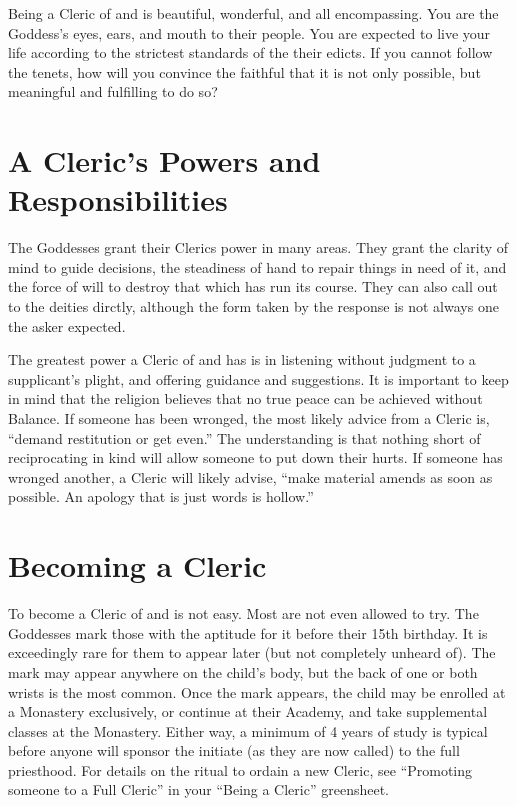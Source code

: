 \documentclass[blue]{GL2020}
\begin{document}
\name{\bLeauCleric{}}

Being a Cleric of \cEbbFull{\full} and \cFlowFull{\full} is beautiful, wonderful, and all encompassing. You are the Goddess's eyes, ears, and mouth to their people. You are expected to live your life according to the strictest standards of the their edicts. If you cannot follow the tenets, how will you convince the faithful that it is not only possible, but meaningful and fulfilling to do so?

\section{A Cleric's Powers and Responsibilities}
The Goddesses grant their Clerics power in many areas. They grant the clarity of mind to guide decisions, the steadiness of hand to repair things in need of it, and the force of will to destroy that which has run its course. They can also call out to the deities dirctly, although the form taken by the response is not always one the asker expected.

The greatest power a Cleric of \cEbb{} and \cFlow{} has is in listening without judgment to a supplicant's plight, and offering guidance and suggestions. It is important to keep in mind that the \pShip{} religion believes that no true peace can be achieved without Balance. If someone has been wronged, the most likely advice from a Cleric is, ``demand restitution or get even.'' The understanding is that nothing short of reciprocating in kind will allow someone to put down their hurts. If someone has wronged another, a Cleric will likely advise, ``make material amends as soon as possible. An apology that is just words is hollow.''

\section{Becoming a Cleric}
To become a Cleric of \cEbb{} and \cFlow{} is not easy. Most are not even allowed to try. The Goddesses mark those with the aptitude for it before their 15th birthday. It is exceedingly rare for them to appear later (but not completely unheard of). The mark may appear anywhere on the child's body, but the back of one or both wrists is the most common. Once the mark appears, the child may be enrolled at a Monastery exclusively, or continue at their Academy, and take supplemental classes at the Monastery. Either way, a minimum of 4 years of study is typical before anyone will sponsor the initiate (as they are now called) to the full priesthood. For details on the ritual to ordain a new Cleric, see ``Promoting someone to a Full Cleric'' in your  ``Being a Cleric'' greensheet.
\end{document}
